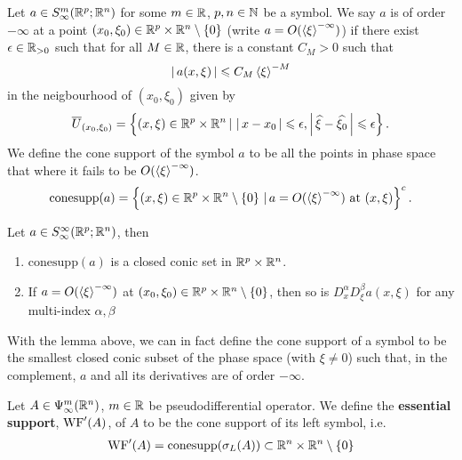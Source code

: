\documentclass{article}
\begin{document}
\begin{fdefinition}
    Let $a \in S^{m}_\infty(\R^{p}; \R^n)$ for some $m \in \R$, $p, n \in \N$ be a symbol. We say $a$ is of order $-\infty$ at a point $(x_0, \xi_0) \in \R^p \times \R^n \setminus \set{0}$ (write $a = O(\sym[\xi]^{-\infty})$) if there exist $\epsilon \in \R_{> 0}$ such that for all $M \in \R$, there is a constant $C_M > 0$ such that 
    \[
    \abs{a(x, \xi)} \leq C_M \sym[\xi]^{-M}
    \]
    in the neigbourhood of $(x_0, \xi_0)$ given by
    \[
    \overline{U}_{(x_0, \xi_0)} = \set{(x, \xi) \in \R^p \times \R^n \wh \abs{x - x_0} \leq \epsilon, \abs{\widehat{\xi} - \widehat{\xi_0}} \leq \epsilon}. 
    \]
    We define the cone support of the symbol $a$ to be all the points in phase space that where it fails to be $O(\sym[\xi]^{-\infty})$. 
    \[
    \mathrm{conesupp}(a) = \set{(x, \xi) \in \R^p \times \R^n \setminus \set{0} \wh a = O(\sym[\xi]^{-\infty}) \text{ at } (x, \xi)}^c. 
    \]
\end{fdefinition}

\begin{flemma}
    Let $a \in S^{\infty}_\infty(\R^{p}; \R^n)$, then 
    \begin{enumerate}
        \item $\mathrm{conesupp}(a)$ is a closed conic set in $\R^p \times \R^n$. 
        \item If $a = O(\sym[\xi]^{-\infty})$ at $(x_0, \xi_0) \in \R^p \times \R^n \setminus \set{0}$, then so is $D^\alpha_x D^\beta_\xi a(x, \xi)$ for any multi-index $\alpha, \beta$
    \end{enumerate}
\end{flemma}

With the lemma above, we can in fact define the cone support of a symbol to be the smallest closed conic subset of the phase space (with $\xi \neq 0$) such that, in the complement, $a$ and all its derivatives are of order $-\infty$.\\
 


\begin{fdefinition}
    Let $A \in \Psi^m_\infty(\R^n)$,  $m \in \R$ be pseudodifferential operator. We define the \textbf{essential support}, $\WF'(A)$, of $A$ to be the cone support of its left symbol, i.e. 
    \begin{align*}
    \WF'(A) = \mathrm{conesupp}(\sigma_L(A)) \subset \R^n \times \R^n \setminus \set{0}
    \end{align*}
\end{fdefinition}
\end{document}
